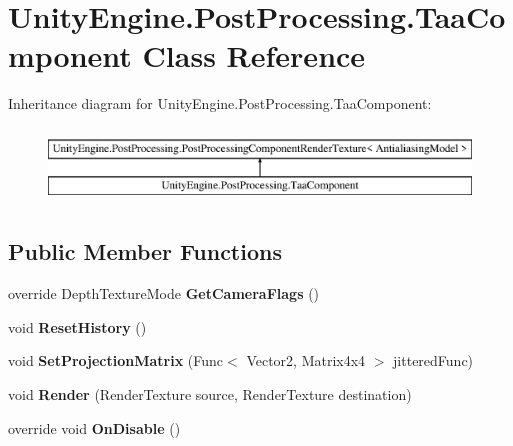 \hypertarget{class_unity_engine_1_1_post_processing_1_1_taa_component}{}\section{Unity\+Engine.\+Post\+Processing.\+Taa\+Component Class Reference}
\label{class_unity_engine_1_1_post_processing_1_1_taa_component}
Inheritance diagram for Unity\+Engine.\+Post\+Processing.\+Taa\+Component\+:\begin{figure}[H]
\begin{center}
\leavevmode
\includegraphics[height=2.000000cm]{class_unity_engine_1_1_post_processing_1_1_taa_component}
\end{center}
\end{figure}
\subsection*{Public Member Functions}
\begin{DoxyCompactItemize}
\item 
\mbox{\label{class_unity_engine_1_1_post_processing_1_1_taa_component_acdb6cc8b86f8792042c7d57579db1e4a}} 
override Depth\+Texture\+Mode {\bfseries Get\+Camera\+Flags} ()
\item 
\mbox{\label{class_unity_engine_1_1_post_processing_1_1_taa_component_a338933e1af86c58cfcd016994651b5d8}} 
void {\bfseries Reset\+History} ()
\item 
\mbox{\label{class_unity_engine_1_1_post_processing_1_1_taa_component_ac388a6ff1c2b47604772d4a18e6e8d24}} 
void {\bfseries Set\+Projection\+Matrix} (Func$<$ Vector2, Matrix4x4 $>$ jittered\+Func)
\item 
\mbox{\label{class_unity_engine_1_1_post_processing_1_1_taa_component_a84a55cff0051067183e6e2daa8cfe317}} 
void {\bfseries Render} (Render\+Texture source, Render\+Texture destination)
\item 
\mbox{\label{class_unity_engine_1_1_post_processing_1_1_taa_component_aae1a9b2df8e23593b75e7eb2c9cc6b4c}} 
override void {\bfseries On\+Disable} ()
\end{DoxyCompactItemize}
